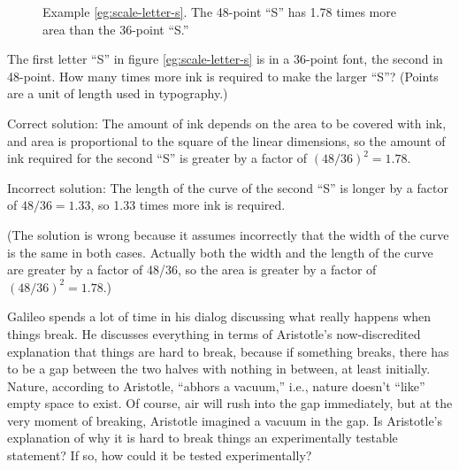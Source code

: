 \begin{figure}[ht] 
\begin{center}
\caption{ \qquad %
%
 Example \ref{eg:scale-letter-s}. The 48-point ``S'' has 1.78 times
 more area than the 36-point ``S.''
 }
\end{center}
\label{eg-scale-letter-s}
\end{figure}


\vspace{1.5mm}

\begin{exmp}
\label{eg:scale-letter-s}
 The first letter ``S'' in figure \ref{eg:scale-letter-s} is in a
36-point font, the second in 48-point. How many times more
ink is required to make the larger ``S''? (Points are a unit
of length used in typography.)

Correct solution: The amount of ink depends on the area to
be covered with ink, and area is proportional to the square
of the linear dimensions, so the amount of ink required for
the second ``S'' is greater by a factor of $(48/36)^2=1.78$.

Incorrect solution: The length of the curve of the second
``S'' is longer by a factor of $48/36=1.33$, so 1.33 times
more ink is required.

(The solution is wrong because it assumes incorrectly that
the width of the curve is the same in both cases. Actually
both the width and the length of the curve are greater by a
factor of 48/36, so the area is greater by a factor
of $(48/36)^2=1.78$.)
\end{exmp}
\divider
\vspace{2mm}

Galileo spends a lot of time in his dialog discussing
what really happens when things break. He discusses
everything in terms of Aristotle's now-discredited
explanation that things are hard to break, because if
something breaks, there has to be a gap between the two
halves with nothing in between, at least initially. Nature,
according to Aristotle, ``abhors a vacuum,'' i.e., nature
doesn't ``like'' empty space to exist. Of course, air will
rush into the gap immediately, but at the very moment of
breaking, Aristotle imagined a vacuum in the gap. Is
Aristotle's explanation of why it is hard to break things an
experimentally testable statement? If so, how could it be
tested experimentally?
\

